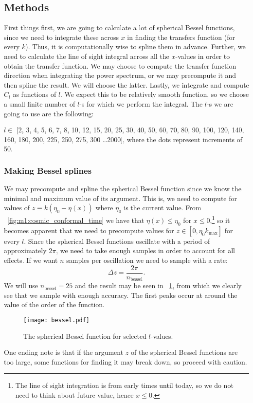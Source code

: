 \subsection{Methods}\label{sec:m4:methods}
    First things first, we are going to calculate a lot of spherical Bessel functions, since we need to integrate these across $x$ in finding the transfers function (for every $k$). Thus, it is computationally wise to spline them in advance. Further, we need to calculate the line of sight integral across all the $x$-values in order to obtain the transfer function. We may choose to compute the transfer function direction when integrating the power spectrum, or we may precompute it and then spline the result. We will choose the latter. Lastly, we integrate and compute $C_l$ as functions of $l$. We expect this to be relatively smooth function, so we choose a small finite number of $l$-s for which we perform the integral. 
    The $l$-s we are going to use are the following:

    $l\in$ [2,    3,    4,    5,    6,    7,    8,    10,   12,   15,   
    20,   25,   30,   40,   50,   60,   70,   80,   90,   100,  
    120,  140,  160,  180,  200,  225,  250,  275,  300 \dots 2000],
    where the dots represent increments of 50. 
    \subsubsection{Making Bessel splines}
        We may precompute and spline the spherical Bessel function since we know the minimal and maximum value of its argument. This is, we need to compute for values of $z\equiv k(\eta_0-\eta(x))$ where $\eta_0$ is the current value. From ~\cref{fig:m1:cosmic_conformal_time} we have that $\eta(x) \leq \eta_0$ for $x\leq0$,\footnote{The line of sight integration is from early times until today, so we do not need to think about future value, hence $x\leq0$.} so it becomes apparent that we need to precompute values for $z\in[0, \eta_0k_\mathrm{max}]$ for every $l$. Since the spherical Bessel functions oscillate with a period of approximately $2\pi$, we need to take enough samples in order to account for all effects. If we want $n$ samples per oscillation we need to sample with a rate:
        \begin{equation}\label{eq:m4:methods:bessel_sampling}
            \Delta z = \frac{2\pi}{n_\mathrm{bessel}}.
        \end{equation}
        We will use $n_\mathrm{bessel}=25$ and the result may be seen in ~\cref{fig:m4:bessel}, from which we clearly see that we sample with enough accuracy. The first peaks occur at around the value of the order of the function. 
        \begin{figure}
            \texttt{[image: bessel.pdf]}
            \caption{The spherical Bessel function for selected $l$-values.}
            \label{fig:m4:bessel}
        \end{figure}
        One ending note is that if the argument $z$ of the spherical Bessel functions are too large, some functions for finding it may break down, so proceed with caution. 

